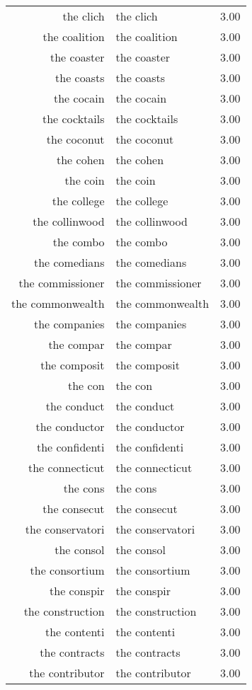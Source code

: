 \begin{table}[ht]
\begin{tabular}{rlr}
  the clich & the clich & 3.00 \\ 
  the coalition & the coalition & 3.00 \\ 
  the coaster & the coaster & 3.00 \\ 
  the coasts & the coasts & 3.00 \\ 
  the cocain & the cocain & 3.00 \\ 
  the cocktails & the cocktails & 3.00 \\ 
  the coconut & the coconut & 3.00 \\ 
  the cohen & the cohen & 3.00 \\ 
  the coin & the coin & 3.00 \\ 
  the college & the college & 3.00 \\ 
  the collinwood & the collinwood & 3.00 \\ 
  the combo & the combo & 3.00 \\ 
  the comedians & the comedians & 3.00 \\ 
  the commissioner & the commissioner & 3.00 \\ 
  the commonwealth & the commonwealth & 3.00 \\ 
  the companies & the companies & 3.00 \\ 
  the compar & the compar & 3.00 \\ 
  the composit & the composit & 3.00 \\ 
  the con & the con & 3.00 \\ 
  the conduct & the conduct & 3.00 \\ 
  the conductor & the conductor & 3.00 \\ 
  the confidenti & the confidenti & 3.00 \\ 
  the connecticut & the connecticut & 3.00 \\ 
  the cons & the cons & 3.00 \\ 
  the consecut & the consecut & 3.00 \\ 
  the conservatori & the conservatori & 3.00 \\ 
  the consol & the consol & 3.00 \\ 
  the consortium & the consortium & 3.00 \\ 
  the conspir & the conspir & 3.00 \\ 
  the construction & the construction & 3.00 \\ 
  the contenti & the contenti & 3.00 \\ 
  the contracts & the contracts & 3.00 \\ 
  the contributor & the contributor & 3.00 \\ 

\end{tabular}
\end{table}
